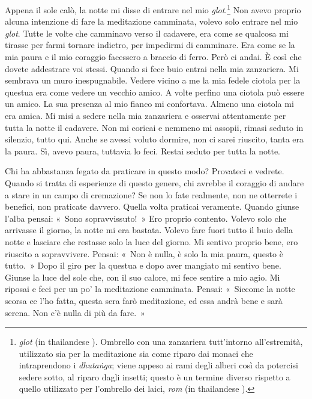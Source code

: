 Appena il sole calò, la notte mi disse di entrare nel mio
\emph{glot}.\footnote{\emph{glot} (in thailandese ). Ombrello con una
  zanzariera tutt'intorno all'estremità, utilizzato sia per la
  meditazione sia come riparo dai monaci che intraprendono i
  \emph{dhutaṅga}; viene appeso ai rami degli alberi così da potercisi
  sedere sotto, al riparo dagli insetti; questo è un termine diverso
  rispetto a quello utilizzato per l'ombrello dei laici, \emph{rom} (in
  thailandese ).} Non avevo proprio alcuna intenzione di fare la
meditazione camminata, volevo solo entrare nel mio \emph{glot}. Tutte le
volte che camminavo verso il cadavere, era come se qualcosa mi tirasse
per farmi tornare indietro, per impedirmi di camminare. Era come se la
mia paura e il mio coraggio facessero a braccio di ferro. Però ci andai.
È così che dovete addestrare voi stessi. Quando si fece buio entrai
nella mia zanzariera. Mi sembrava un muro inespugnabile. Vedere vicino a
me la mia fedele ciotola per la questua era come vedere un vecchio
amico. A volte perfino una ciotola può essere un amico. La sua presenza
al mio fianco mi confortava. Almeno una ciotola mi era amica. Mi misi a
sedere nella mia zanzariera e osservai attentamente per tutta la notte
il cadavere. Non mi coricai e nemmeno mi assopii, rimasi seduto in
silenzio, tutto qui. Anche se avessi voluto dormire, non ci sarei
riuscito, tanta era la paura. Sì, avevo paura, tuttavia lo feci. Restai
seduto per tutta la notte.

Chi ha abbastanza fegato da praticare in questo modo? Provateci e
vedrete. Quando si tratta di esperienze di questo genere, chi avrebbe il
coraggio di andare a stare in un campo di cremazione? Se non lo fate
realmente, non ne otterrete i benefici, non praticate davvero. Quella
volta praticai veramente. Quando giunse l'alba pensai: «~Sono
sopravvissuto!~» Ero proprio contento. Volevo solo che arrivasse il
giorno, la notte mi era bastata. Volevo fare fuori tutto il buio della
notte e lasciare che restasse solo la luce del giorno. Mi sentivo
proprio bene, ero riuscito a sopravvivere. Pensai: «~Non è nulla, è solo
la mia paura, questo è tutto.~» Dopo il giro per la questua e dopo aver
mangiato mi sentivo bene. Giunse la luce del sole che, con il suo
calore, mi fece sentire a mio agio. Mi riposai e feci per un po' la
meditazione camminata. Pensai: «~Siccome la notte scorsa ce l'ho fatta,
questa sera farò meditazione, ed essa andrà bene e sarà serena. Non c'è
nulla di più da fare.~»

